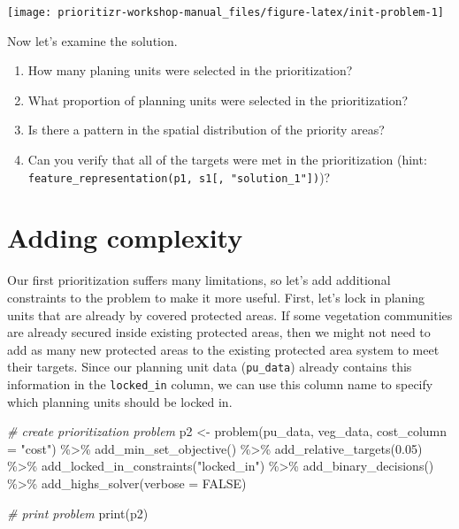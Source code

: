 \documentclass[
  12pt,
]{book}
\makeatletter
\newenvironment{Shaded}{\begin{snugshade}}{\end{snugshade}}
\newcommand{\AttributeTok}[1]{\textcolor[rgb]{0.77,0.63,0.00}{#1}}
\newcommand{\CommentTok}[1]{\textcolor[rgb]{0.56,0.35,0.01}{\textit{#1}}}
\newcommand{\ConstantTok}[1]{\textcolor[rgb]{0.00,0.00,0.00}{#1}}
\newcommand{\FloatTok}[1]{\textcolor[rgb]{0.00,0.00,0.81}{#1}}
\newcommand{\FunctionTok}[1]{\textcolor[rgb]{0.00,0.00,0.00}{#1}}
\newcommand{\NormalTok}[1]{#1}
\newcommand{\OtherTok}[1]{\textcolor[rgb]{0.56,0.35,0.01}{#1}}
\newcommand{\SpecialCharTok}[1]{\textcolor[rgb]{0.00,0.00,0.00}{#1}}
\newcommand{\StringTok}[1]{\textcolor[rgb]{0.31,0.60,0.02}{#1}}
\providecommand{\tightlist}{%
  \setlength{\itemsep}{0pt}\setlength{\parskip}{0pt}}
\newenvironment{kframe}{%
\medskip{}
\setlength{\fboxsep}{.8em}
 \def\at@end@of@kframe{}%
 \ifinner\ifhmode%
  \def\at@end@of@kframe{\end{minipage}}%
  \begin{minipage}{\columnwidth}%
 \fi\fi%
 \def\FrameCommand##1{\hskip\@totalleftmargin \hskip-\fboxsep
 \colorbox{shadecolor}{##1}\hskip-\fboxsep
     \hskip-\linewidth \hskip-\@totalleftmargin \hskip\columnwidth}%
 \MakeFramed {\advance\hsize-\width
   \@totalleftmargin\z@ \linewidth\hsize
   \@setminipage}}%
 {\par\unskip\endMakeFramed%
 \at@end@of@kframe}
\newenvironment{rmdblock}[1]
  {
  \begin{itemize}
  \renewcommand{\labelitemi}{
    \raisebox{-.7\height}[0pt][0pt]{
      {\setkeys{Gin}{width=3em,keepaspectratio}\texttt{[image: images/\#1]}}
    }
  }
  \setlength{\fboxsep}{1em}
  \begin{kframe}
  \item
  }
  {
  \end{kframe}
  \end{itemize}
  }
\newenvironment{rmdquestion}
  {\begin{rmdblock}{question}}
  {\end{rmdblock}}
\makeatother
\begin{document}
\begin{center}\texttt{[image: prioritizr-workshop-manual\_files/figure-latex/init-problem-1]} \end{center}

Now let's examine the solution.

\begin{rmdquestion}
\begin{enumerate}
\def\labelenumi{\arabic{enumi}.}
\tightlist
\item
  How many planing units were selected in the prioritization?
\item
  What proportion of planning units were selected in the prioritization?
\item
  Is there a pattern in the spatial distribution of the priority areas?
\item
  Can you verify that all of the targets were met in the prioritization (hint: \texttt{feature\_representation(p1,\ s1{[},\ "solution\_1"{]})})?
\end{enumerate}
\end{rmdquestion}

\clearpage

\hypertarget{adding-complexity}{%
\section{Adding complexity}\label{adding-complexity}}

Our first prioritization suffers many limitations, so let's add additional constraints to the problem to make it more useful. First, let's lock in planing units that are already by covered protected areas. If some vegetation communities are already secured inside existing protected areas, then we might not need to add as many new protected areas to the existing protected area system to meet their targets. Since our planning unit data (\texttt{pu\_data}) already contains this information in the \texttt{locked\_in} column, we can use this column name to specify which planning units should be locked in.

\begin{Shaded}
\begin{Highlighting}[]
\CommentTok{\# create prioritization problem}
\NormalTok{p2 }\OtherTok{\textless{}{-}}
  \FunctionTok{problem}\NormalTok{(pu\_data, veg\_data, }\AttributeTok{cost\_column =} \StringTok{"cost"}\NormalTok{) }\SpecialCharTok{\%\textgreater{}\%}
  \FunctionTok{add\_min\_set\_objective}\NormalTok{() }\SpecialCharTok{\%\textgreater{}\%}
  \FunctionTok{add\_relative\_targets}\NormalTok{(}\FloatTok{0.05}\NormalTok{) }\SpecialCharTok{\%\textgreater{}\%}
  \FunctionTok{add\_locked\_in\_constraints}\NormalTok{(}\StringTok{"locked\_in"}\NormalTok{) }\SpecialCharTok{\%\textgreater{}\%}
  \FunctionTok{add\_binary\_decisions}\NormalTok{() }\SpecialCharTok{\%\textgreater{}\%}
  \FunctionTok{add\_highs\_solver}\NormalTok{(}\AttributeTok{verbose =} \ConstantTok{FALSE}\NormalTok{)}

\CommentTok{\# print problem}
\FunctionTok{print}\NormalTok{(p2)}
\end{Highlighting}
\end{Shaded}
\end{document}
